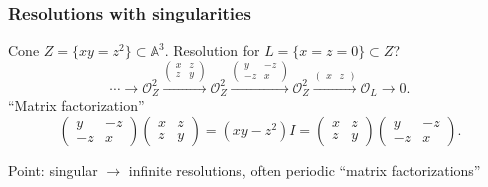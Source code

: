 \documentclass{beamer}
\newcommand{\A}{\mathbb{A}}
\renewcommand{\O}{\mathcal{O}}
\begin{document}
\begin{frame}
    \frametitle{Resolutions with singularities}

    Cone $Z=\{xy=z^2\}\subset\A^3$. \pause
    Resolution for $L=\{x=z=0\}\subset Z$? \pause
    \begin{equation*}
        \cdots \to
        \O_Z^2 \xrightarrow{\begin{pmatrix}
            x & z \\ z & y
        \end{pmatrix}}
        \O_Z^2 \xrightarrow{\begin{pmatrix}
            y & -z \\ -z & x
        \end{pmatrix}}
        \O_Z^2 \xrightarrow{\begin{pmatrix}
            x & z
        \end{pmatrix}}
        \O_L\to0.
    \end{equation*} \pause
    ``Matrix factorization''
    \begin{equation*}
        \begin{pmatrix}
            y & -z \\ -z & x
        \end{pmatrix}
        \begin{pmatrix}
            x & z \\ z & y
        \end{pmatrix}
            = (xy-z^2)I =
        \begin{pmatrix}
            x & z \\ z & y
        \end{pmatrix}
        \begin{pmatrix}
            y & -z \\ -z & x
        \end{pmatrix}.
    \end{equation*} \pause

    Point: singular $\to$ infinite resolutions, often periodic ``matrix
    factorizations''
\end{frame}
\end{document}
